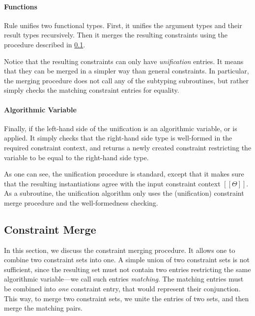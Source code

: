 \paragraph{Functions}
  Rule  unifies two functional types. 
  First, it unifies the argument types and their result types recursively.
  Then it merges the resulting constraints using the procedure described in \cref{sec:constraint-merge}.

  Notice that the resulting constraints can only have \emph{unification} entries.
  It means that they can be merged in a simpler way than general constraints.
  In particular, the merging procedure does not call any of the subtyping subroutines,
  but rather simply checks the matching constraint entries for equality.

\paragraph{Algorithmic Variable}
  Finally, if the left-hand side of the unification is an algorithmic variable,
   or  is applied. 
  It simply checks that the right-hand side type is well-formed in the required
  constraint context, and returns a newly created constraint restricting the variable
  to be equal to the right-hand side type.

\vspace{\baselineskip}
As one can see, the unification procedure is standard, 
except that it makes sure that the resulting instantiations agree with the input
constraint context $[[Θ]]$.  As a subroutine, the unification algorithm only uses the (unification) 
constraint merge procedure and the well-formedness checking.

\subsection{Constraint Merge}
\label{sec:constraint-merge}

In this section, we discuss the constraint merging procedure.
It allows one to combine two constraint sets into one. 
A simple union of two constraint sets is not sufficient, 
since the resulting set must not contain two entries restricting the 
same algorithmic variable---we call such entries \emph{matching}.
The matching entries must be combined into \emph{one} constraint entry, that 
would represent their conjunction. 
This way, to merge two constraint sets, we unite the entries of two
sets, and then merge the matching pairs.

